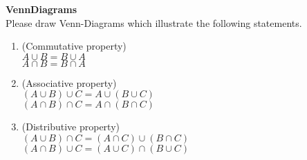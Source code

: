 \textbf{VennDiagrams}\\
Please draw Venn-Diagrams which illustrate the following statements.
	\begin{enumerate}
		\item (Commutative property)\\
		$A\cup B  = B \cup A$ \\  $A\cap B  = B \cap A$ 
		\item (Associative property)\\
		$(A\cup B) \cup C  = A \cup (B \cup C)$ \\  $(A\cap B) \cap C  = A \cap (B \cap C)$ 
		\item (Distributive property)\\
		$(A \cup B) \cap C = (A\cap C) \cup (B \cap C)$ \\
		$(A \cap B) \cup C = (A\cup C) \cap (B \cup C)$
	\end{enumerate}
